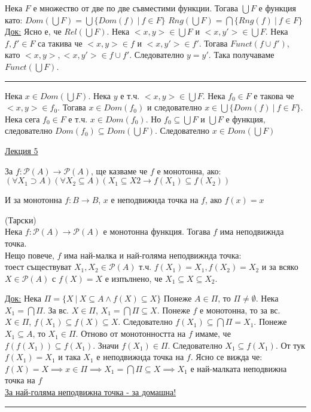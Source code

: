 \documentclass[fleqn, titlepage, 12pt]{report}
\begin{document}
 Нека $F$ е множество от две по две съвместими функции. Тогава $ \bigcup F $ е функция като:
$ Dom(\bigcup F) = \bigcup \{Dom(f)\ |\ f \in F\} $
$ Rng(\bigcup F) = \bigcap \{Rng(f)\ |\ f \in F\} $
\bigbreak
\underline{Док:} Ясно е, че $Rel(\bigcup F)$. Нека $<x,y> \in \bigcup F$ и $<x,y'> \in \bigcup F$.
Нека $f, f' \in F$ са такива че $<x,y> \in f$ и $<x,y'> \in f'$. Тогава $Funct(f \cup f')$,
като $<x,y>,<x,y'> \in f \cup f'$. Следователно $y = y'$. Така получаваме $Funct(\bigcup F)$.
\bigbreak
\hrule
\bigbreak

Нека $x \in Dom(\bigcup F)$. Нека $y$ е т.ч. $ <x,y> \in \bigcup F $. Нека $f_0 \in F$ е такова че $<x,y> \in f_0$.
Тогава $x \in Dom(f_0)$ и следователно $x \in \bigcup \{Dom(f)\ |\ f \in F\}$.
Нека сега $f_0 \in F$ е т.ч. $x \in Dom(f_0)$. Но $f_0 \subseteq \bigcup F$ и $ \bigcup F$ е функция, следователно
$Dom(f_0) \subseteq Dom(\bigcup F)$. Следователно $x \in Dom(\bigcup F)$

\clearpage
\begin{center}
  \underline{\huge\normalfont Лекция 5}
\end{center}
\bigbreak

За $f : \mathcal{P}(A) \rightarrow \mathcal{P}(A)$, ще казваме че $f$ е монотонна, ако: \\
$ (\forall{X_1 \supset A})(\forall{X_2 \subseteq A})(X_1 \subseteq X2 \rightarrow f(X_1) \subseteq f(X_2)) $
\bigbreak

И за монотонна $f : B \rightarrow B$, $ x $ е неподвижнда точка на $ f $, ако $f(x) = x$
\bigbreak

 (Тарски)\\
Нека $f: \mathcal{P}(A) \rightarrow \mathcal{P}(A)$ е монотонна функция. Тогава $f$ има неподвижнда точка.\\
Нещо повече, $ f$ има най-малка и най-голяма неподвижнда точка:\\
тоест съществуват $X_1,X_2 \in \mathcal{P}(A)$ т.ч.
$f(X_1) = X_1, f(X_2) = X_2$ и за всяко $X \in \mathcal{P}(A)$ с $f(X) = X$ е изпълнено, че $X_1 \subseteq X \subseteq X_2$.
\bigbreak

\underline{Док:} Нека $\Pi = \{X\ |\ X \subseteq A \land f(X) \subseteq X\}$
Понеже $A \in \Pi$, то $\Pi \neq \emptyset$. Нека $X_1 = \bigcap \Pi$.
За вс. $X \in \Pi$, $X_1 = \bigcap \Pi \subseteq X$. Понеже $f$ е монотонна,
то за вс. $X \in \Pi$, $f(X_1) \subseteq f(X) \subseteq X$. Следователно $f(X_1) \subseteq \bigcap \Pi = X_1$.
Понеже $X_1 \subseteq A$, то $X_1 \in \Pi$. Отново от монотонността на $f$ имаме, че
$f(f(X_1)) \subseteq f(X_1)$. Значи $f(X_1) \in \Pi$. Следователно $X_1 \subseteq f(X_1)$.
От тук $f(X_1) = X_1$ и така $X_1$ е неподвижнда точка на $f$. Ясно се вижда че:
$f(X) = X \implies x \in \Pi \implies X_1 = \bigcap \Pi \subseteq X \implies X_1$ е най-малката неподвижна точка на $f$\\
\underline{За най-голяма неподвижна точка - за домашна!}
\bigbreak
\hrule
\bigbreak
\end{document}
